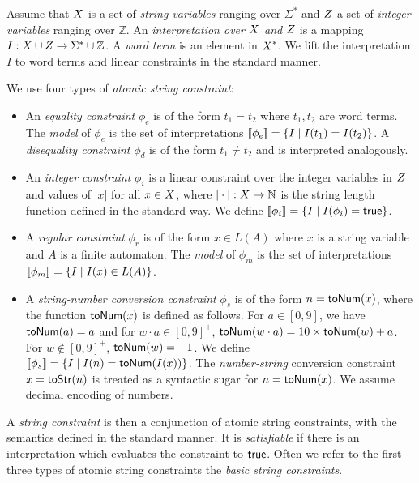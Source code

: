 \documentclass[sigplan,screen]{acmart}
\begin{document}
Assume that $\mbox{$X$}$ is a set of \emph{string variables} ranging over $\Sigma^*$ and $\mbox{$Z$}$ a set of \emph{integer variables} ranging over $\mathbb{Z}$.
An \emph{interpretation over $\mbox{$X$}$ and $\mbox{$Z$}$} is a mapping $I:\mbox{$X$}\cup \mbox{$Z$}\rightarrow\Sigma^* \cup \mathbb{Z}$. A \emph{word term} is an element in $\mbox{$X$}^*$. We lift the interpretation $I$ to word terms and linear constraints in the standard manner. 

We  use four types of \emph{atomic string constraint}: 
\begin{itemize}

\item An \emph{equality constraint} $\phi_e$ is of the form $t_1 = t_2$ where $t_1, 
t_2$ are word terms. The \emph{model} of $\phi_e$ is the set of interpretations $[\![\phi_e]\!]=\{I\mid 
I(t_1)=I(t_2)\}$. A \emph{disequality constraint} $\phi_d$ is of the form $t_1 \neq 
t_2$ and is interpreted analogously.

\item An \emph{integer constraint} $\phi_i$ is a linear constraint over the integer variables in $\mbox{$Z$}$ and values of $|x|$ for all $x \in \mbox{$X$}$, where $|\cdot|:\mbox{$X$} \rightarrow \mathbb{N}$ is the string length function defined in the standard way.
We define $[\![\phi_i]\!]= \{I \mid I(\phi_i)= \mbox{$\mathsf{true}$} \}$. 


\item A \emph{regular constraint} $\phi_r$ is of the form $x \in L(A)$ where $x$ is a string variable and $A$ is a finite automaton. The \emph{model} of $\phi_m$ is the set of interpretations $[\![\phi_m]\!]=\{I\mid 
I(x) \in L(A) \}$. 


\item A \emph{string-number conversion constraint} $\phi_s$ is of the form $n=\mbox{\textsf{toNum}($x$)}$, where the function $\mbox{\textsf{toNum}($x$)}$ is defined as follows. For $a\in [0,9]$, we have $\mbox{\textsf{toNum}($a$)}=a$ and for $w \cdot a \in [0,9]^+$, $\mbox{\textsf{toNum}($w\cdot a$)} = 10\times \mbox{\textsf{toNum}($w$)}+a$. For $w\notin [0,9]^+$, $\mbox{\textsf{toNum}($w$)}=-1$. We define $[\![\phi_s]\!]= \{I \mid I(n)= \mbox{\textsf{toNum}($I(x)$)} \}$. The \emph{number-string} conversion constraint $x=\mbox{\textsf{toStr}($n$)}$ is treated as a syntactic sugar for $n=\mbox{\textsf{toNum}($x$)}$. We assume decimal encoding of numbers.

\end{itemize}

A \emph{string constraint} is then a conjunction of atomic string constraints, with the semantics defined in the standard manner. It is \emph{satisfiable} if there is an interpretation which evaluates the  constraint to $\mbox{$\mathsf{true}$}$. Often we refer to the first three types of atomic string constraints the \emph{basic string constraints}.
\end{document}
